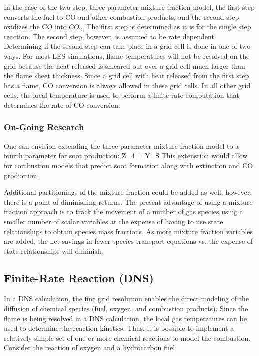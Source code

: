 \documentclass[11pt]{book}
\begin{document}
In the case of the two-step, three parameter mixture fraction model, the first step converts the
fuel to CO and other combustion products, and the second step oxidizes the CO into $CO_2$.  The first step is
determined as it is for the single step reaction.  The second step, however, is assumed to be rate dependent.
Determining if the second step can take place in a grid cell is done in one of two ways.  For most LES
simulations, flame temperatures will not be resolved on the grid because the heat released is smeared out over a grid cell much larger than
the flame sheet thickness.  Since a grid cell with heat released from the first step has a flame, CO conversion is
always allowed in these grid cells.  In all other grid cells, the local temperature is used to perform a finite-rate
computation that determines the rate of CO conversion.



\subsubsection{On-Going Research}

One can envision extending the three parameter mixture fraction model to a fourth parameter for soot production:
\be Z_4 =  Y_S \ee
This extenstion would allow for combustion models that predict soot formation along with extinction and CO production.

Additional partitionings of the mixture fraction could be added as well; however, there is a point of diminishing
returns.  The present advantage of using a mixture fraction approach is to track the movement of a number of gas
species using a smaller number of scalar variables at the expense of having to use state relationships to obtain
species mass fractions.  As more mixture fraction variables are added, the net savings in fewer species transport
equations vs. the expense of state relationships will diminish.

\clearpage



\subsection{Finite-Rate Reaction (DNS)}

In a DNS calculation, the fine grid resolution enables the direct modeling of the diffusion of chemical species (fuel,
oxygen, and combustion products).  Since the flame is being resolved in a DNS calculation, the local gas
temperatures can be used to determine the reaction kinetics.  Thus, it is possible to implement a relatively simple
set of one or more chemical reactions to model the combustion. Consider the reaction of oxygen and a hydrocarbon
fuel
\end{document}
